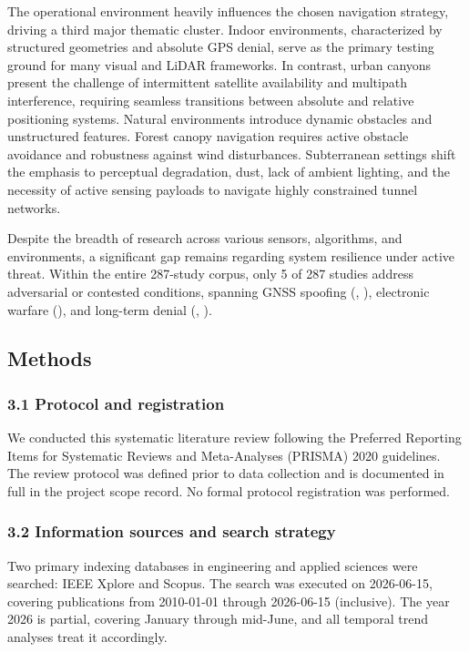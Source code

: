 \documentclass[conference]{IEEEtran}
\begin{document}
The operational environment heavily influences the chosen navigation strategy, driving a third major thematic cluster. Indoor environments, characterized by structured geometries and absolute GPS denial, serve as the primary testing ground for many visual and LiDAR frameworks. In contrast, urban canyons present the challenge of intermittent satellite availability and multipath interference, requiring seamless transitions between absolute and relative positioning systems. Natural environments introduce dynamic obstacles and unstructured features. Forest canopy navigation requires active obstacle avoidance and robustness against wind disturbances. Subterranean settings shift the emphasis to perceptual degradation, dust, lack of ambient lighting, and the necessity of active sensing payloads to navigate highly constrained tunnel networks.


Despite the breadth of research across various sensors, algorithms, and environments, a significant gap remains regarding system resilience under active threat. Within the entire 287-study corpus, only 5 of 287 studies address adversarial or contested conditions, spanning GNSS spoofing (\cite{REC_0010}, \cite{REC_0489}), electronic warfare (\cite{REC_1083}), and long-term denial (\cite{REC_1084}, \cite{REC_1085}).


\subsection{Methods}


\subsubsection{3.1 Protocol and registration}


We conducted this systematic literature review following the Preferred Reporting Items for Systematic Reviews and Meta-Analyses (PRISMA) 2020 guidelines. The review protocol was defined prior to data collection and is documented in full in the project scope record. No formal protocol registration was performed.


\subsubsection{3.2 Information sources and search strategy}


Two primary indexing databases in engineering and applied sciences were searched: IEEE Xplore and Scopus. The search was executed on 2026-06-15, covering publications from 2010-01-01 through 2026-06-15 (inclusive). The year 2026 is partial, covering January through mid-June, and all temporal trend analyses treat it accordingly.
\end{document}
